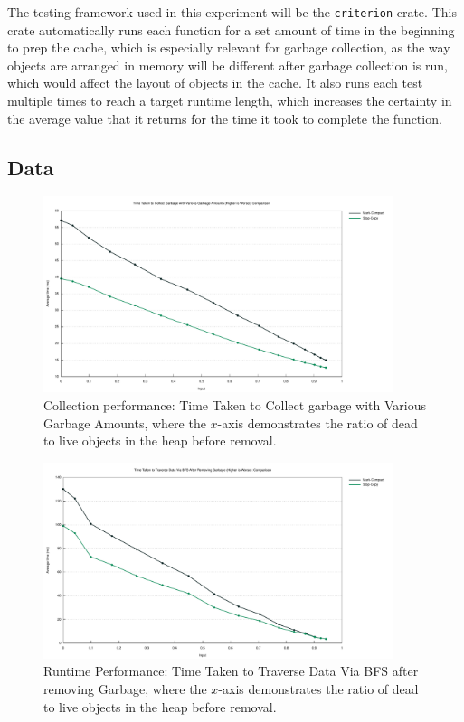 \documentclass[index]{subfiles}
\begin{document}
The testing framework used in this experiment will be the \verb+criterion+ crate. This crate automatically runs each function for a set amount of time in the beginning to prep the cache\cite{brookheislerAnalysisProcessCriterion}, which is especially relevant for garbage collection, as the way objects are arranged in memory will be different after garbage collection is run, which would affect the layout of objects in the cache. It also runs each test multiple times to reach a target runtime length, which increases the certainty in the average value that it returns for the time it took to complete the function\cite{brookheislerAnalysisProcessCriterion}.

\subsection{Data}
\begin{figure}[H]
    \centering
    \includegraphics[width=0.91\textwidth]{pics/collect.pdf}
    \caption{Collection performance: Time Taken to Collect garbage with Various Garbage Amounts, where the \(x\)-axis demonstrates the ratio of dead to live objects in the heap before removal.}
\end{figure}
\begin{figure}[H]
    \centering
    \includegraphics[width=0.91\textwidth]{pics/bfs.pdf}
    \caption{Runtime Performance: Time Taken to Traverse Data Via BFS after removing Garbage, where the \(x\)-axis demonstrates the ratio of dead to live objects in the heap before removal.}
\end{figure}
\end{document}

